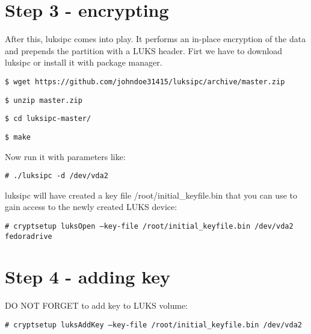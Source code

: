 \section{Step 3 - encrypting}
After this, luksipc comes into play. It performs an in-place encryption of the data and prepends the partition with a LUKS header. Firt we have to download luksipc or install it with package manager.

{\tt \$ wget https://github.com/johndoe31415/luksipc/archive/master.zip}

{\tt \$ unzip master.zip}

{\tt \$ cd luksipc-master/}

{\tt \$ make}

Now run it with parameters like:

{\tt \# ./luksipc -d /dev/vda2}

luksipc will have created a key file /root/initial\_keyfile.bin that you can use to gain access to the newly created LUKS device:

{\tt \# cryptsetup luksOpen --key-file /root/initial\_keyfile.bin /dev/vda2 fedoradrive}

\section{Step 4 - adding key}

DO NOT FORGET to add key to LUKS volume:

{\tt \# cryptsetup luksAddKey --key-file /root/initial\_keyfile.bin /dev/vda2}
